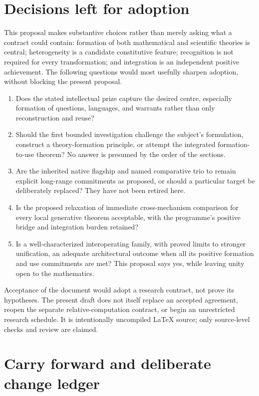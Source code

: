 \documentclass[11pt]{article}
\theoremstyle{definition}
\begin{document}
\section{Decisions left for adoption}
\label{sec:adoption}

This proposal makes substantive choices rather than merely asking what a contract could contain: formation of both mathematical and scientific theories is central; heterogeneity is a candidate constitutive feature; recognition is not required for every transformation; and integration is an independent positive achievement. The following questions would most usefully sharpen adoption, without blocking the present proposal.

\begin{enumerate}
\item Does the stated intellectual prize capture the desired centre, especially formation of questions, languages, and warrants rather than only reconstruction and reuse?
\item Should the first bounded investigation challenge the subject's formulation, construct a theory-formation principle, or attempt the integrated formation-to-use theorem? No answer is presumed by the order of the sections.
\item Are the inherited native flagship and named comparative trio to remain explicit long-range commitments as proposed, or should a particular target be deliberately replaced? They have not been retired here.
\item Is the proposed relaxation of immediate cross-mechanism comparison for every local generative theorem acceptable, with the programme's positive bridge and integration burden retained?
\item Is a well-characterized interoperating family, with proved limits to stronger unification, an adequate architectural outcome when all its positive formation and use commitments are met? This proposal says yes, while leaving unity open to the mathematics.
\end{enumerate}

Acceptance of the document would adopt a research contract, not prove its hypotheses. The present draft does not itself replace an accepted agreement, reopen the separate relative-computation contract, or begin an unrestricted research schedule. It is intentionally uncompiled \LaTeX{} source; only source-level checks and review are claimed.

\appendix
\section{Carry forward and deliberate change ledger}
\label{app:ledger}
\end{document}
